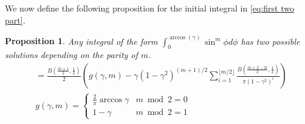 \documentclass{article}
\newtheorem{proposition}{Proposition}
\begin{document}
We now define the following proposition for the initial integral in \ref{eq:first two part}.
\begin{proposition} \label{prop:sin integral}
	Any integral of the form $\int_0^{\arccos(\gamma)} \sin^m \phi d\phi$ has two possible solutions depending on the parity of $m$.
	\begin{align}
		& = \frac{B(\frac{m+1}{2}, \frac{1}{2})}{2}\left(g(\gamma, m) - \gamma(1-\gamma^2)^{(m+1)/2} \sum_{i=1}^{\lfloor m/2 \rfloor}\frac{B(\frac{m+2-2i}{2}, \frac{1}{2})}{\pi(1-\gamma^2)^i}\right) \\
		& g(\gamma, m)=\begin{cases}
			\frac{2}{\pi}\arccos \gamma & m \bmod 2=0 \\
			1 - \gamma & m \bmod 2=1
		\end{cases}
	\end{align}
\end{proposition}
\end{document}
